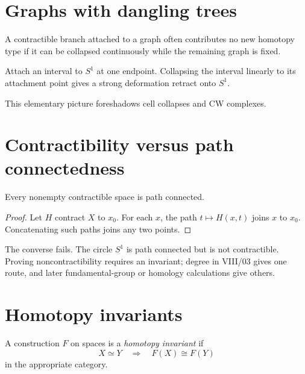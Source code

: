 \section{Graphs with dangling trees}

A contractible branch attached to a graph often contributes no new homotopy
type if it can be collapsed continuously while the remaining graph is fixed.

\begin{example}
\label{ex:viii02-whisker}
Attach an interval to \(S^1\) at one endpoint.  Collapsing the interval linearly
to its attachment point gives a strong deformation retract onto \(S^1\).
\end{example}

This elementary picture foreshadows cell collapses and CW complexes.

\section{Contractibility versus path connectedness}

\begin{proposition}
\label{prop:viii02-contract-path}
Every nonempty contractible space is path connected.
\end{proposition}

\begin{proof}
Let \(H\) contract \(X\) to \(x_0\).  For each \(x\), the path
\(t\mapsto H(x,t)\) joins \(x\) to \(x_0\).  Concatenating such paths joins any
two points.
\end{proof}

\begin{warning}
The converse fails.  The circle \(S^1\) is path connected but is not
contractible.  Proving noncontractibility requires an invariant; degree in
VIII/03 gives one route, and later fundamental-group or homology calculations
give others.
\end{warning}

\section{Homotopy invariants}

\begin{definition}
\label{def:viii02-invariant}
A construction \(F\) on spaces is a \emph{homotopy invariant} if
\[
X\simeq Y
\quad\Longrightarrow\quad
F(X)\cong F(Y)
\]
in the appropriate category.
\end{definition}

